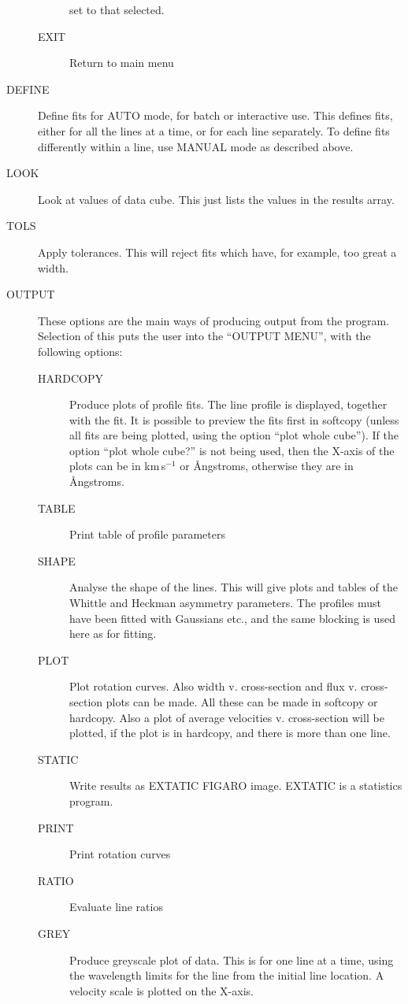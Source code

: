 \begin{description}
\begin{description}
set to that selected.
\item[EXIT] Return to main menu
\end{description}
\item[DEFINE] Define fits for AUTO mode, for batch or interactive use.
This defines fits, either for all the lines at a time, or for each line
separately.
To define fits differently within a line, use MANUAL mode as described
above.
\item[LOOK] Look at values of data cube.
This just lists the values in the results array.
\item[TOLS] Apply tolerances.
This will reject fits which have, for example, too great a width.
\item[OUTPUT] These options are the main ways of producing output
from the program.
Selection of this puts the user into the ``OUTPUT MENU'', with the
following options:\\
\begin{description}
\item[HARDCOPY] Produce plots of profile fits.
The line profile is displayed, together with the fit.
It is possible to preview the fits first in softcopy (unless all fits
are being plotted, using the option ``plot whole cube'').
If the option ``plot whole cube?'' is not being used, then the X-axis of
the plots can be in km\,s$^{-1}$ or {\AA}ngstroms, otherwise they are in
{\AA}ngstroms.
\item[TABLE] Print table of profile parameters
\item[SHAPE] Analyse the shape of the lines.
This will give plots and tables of the Whittle and Heckman asymmetry
parameters.
The profiles must have been fitted with Gaussians etc., and the same
blocking is used here as for fitting.
\item[PLOT] Plot rotation curves.
Also width v. cross-section and flux v. cross-section plots can be made.
All these can be made in softcopy or hardcopy.
Also a plot of average velocities v. cross-section will be plotted, if
the plot is in hardcopy, and there is more than one line.
\item[STATIC] Write results as EXTATIC FIGARO image.
EXTATIC is a statistics program.
\item[PRINT] Print rotation curves
\item[RATIO] Evaluate line ratios
\item[GREY] Produce greyscale plot of data.
This is for one line at a time, using the wavelength limits for the line
from the initial line location.
A velocity scale is plotted on the X-axis.

\end{description}
\end{description}
